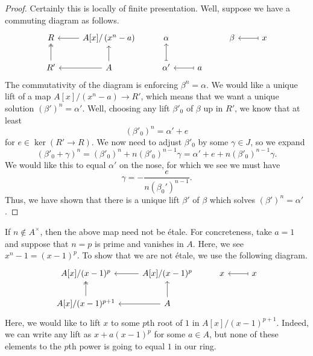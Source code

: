 \documentclass[../notes.tex]{subfiles}
\begin{document}
\begin{proof}
	Certainly this is locally of finite presentation. Well, suppose we have a commuting diagram as follows.
	\[\begin{tikzcd}
		R & {A[x]/\left(x^n-a\right)} & \alpha && \beta & x \\
		{R'} & A & {\alpha'} & a
		\arrow[two heads, from=2-1, to=1-1]
		\arrow[from=2-2, to=2-1]
		\arrow[from=2-2, to=1-2]
		\arrow[from=1-2, to=1-1]
		\arrow[maps to, from=2-4, to=2-3]
		\arrow[maps to, from=2-3, to=1-3]
		\arrow[maps to, from=1-6, to=1-5]
	\end{tikzcd}\]
	The commutativity of the diagram is enforcing $\beta^n=\alpha$. We would like a unique lift of a map $A[x]/\left(x^n-a\right)\to R'$, which means that we want a unique solution $(\beta')^n=\alpha'$. Well, choosing any lift $\beta'_0$ of $\beta$ up in $R'$, we know that at least
	\[(\beta'_0)^n=\alpha'+e\]
	for $e\in\ker(R'\to R)$. We now need to adjust $\beta'_0$ by some $\gamma\in J$, so we expand
	\[(\beta'_0+\gamma)^n=(\beta'_0)^n+n(\beta'_0)^{n-1}\gamma=\alpha'+e+n(\beta'_0)^{n-1}\gamma.\]
	We would like this to equal $\alpha'$ on the nose, for which we see we must have
	\[\gamma=-\frac e{n(\beta_0')^{n-1}}.\]
	Thus, we have shown that there is a unique lift $\beta'$ of $\beta$ which solves $(\beta')^n=\alpha'$.
\end{proof}
\begin{remark}
	If $n\notin A^\times$, then the above map need not be \'etale. For concreteness, take $a=1$ and suppose that $n=p$ is prime and vanishes in $A$. Here, we see $x^n-1=(x-1)^p$. To show that we are not \'etale, we use the following diagram.
	\[\begin{tikzcd}
		{A[x]/(x-1)^p} & {A[x]/(x-1)^p} & x & x \\
		{A[x]/(x-1)^{p+1}} & A
		\arrow[two heads, from=2-1, to=1-1]
		\arrow[from=2-2, to=2-1]
		\arrow[from=2-2, to=1-2]
		\arrow[from=1-2, to=1-1]
		\arrow[maps to, from=1-4, to=1-3]
	\end{tikzcd}\]
	Here, we would like to lift $x$ to some $p$th root of $1$ in $A[x]/(x-1)^{p+1}$. Indeed, we can write any lift as $x+a(x-1)^p$ for some $a\in A$, but none of these elements to the $p$th power is going to equal $1$ in our ring.
\end{remark}
\end{document}
